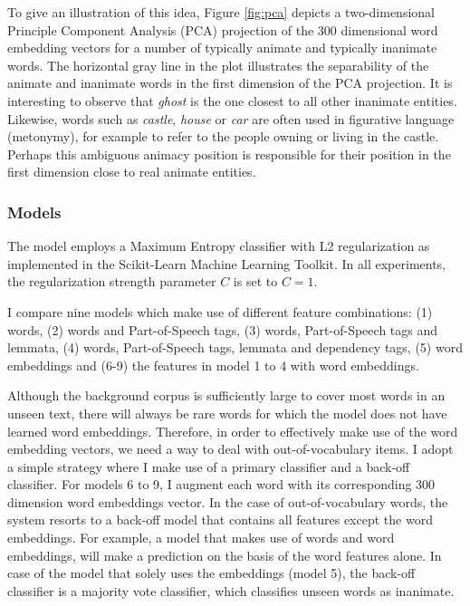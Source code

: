 To give an illustration of this idea, Figure \ref{fig:pca} depicts a two-dimensio\-nal Principle Component Analysis (PCA) projection of the 300 dimensional word embedding vectors for a number of typically animate and typically inanimate words. The horizontal gray line in the plot illustrates the separability of the animate and inanimate words in the first dimension of the PCA projection. It is interesting to observe that \emph{ghost} is the one closest to all other inanimate entities. Likewise, words such as \emph{castle}, \emph{house} or \emph{car} are often used in figurative language (metonymy), for example to refer to the people owning or living in the castle. Perhaps this ambiguous animacy position is responsible for their position in the first dimension close to real animate entities.


\subsubsection{Models}\label{sec:animacy-models}
The model employs a Maximum Entropy classifier with L2 regularization as implemented in the Scikit-Learn Machine Learning Toolkit\autocite{sklearn:2011}. In all experiments, the regularization strength parameter $C$ is set to $C=1$.

I compare nine models which make use of different feature combinations: (1) words, (2) words and Part-of-Speech tags, (3) words, Part-of-Speech tags and lemmata, (4) words, Part-of-Speech tags, lemmata and dependency tags, (5) word embeddings and (6-9) the features in model 1 to 4 with word embeddings.

Although the background corpus is sufficiently large to cover most words in an unseen text, there will always be rare words for which the model does not have learned word embeddings. Therefore, in order to effectively make use of the word embedding vectors, we need a way to deal with out-of-vocabulary items. I adopt a simple strategy where I make use of a primary classifier and a back-off classifier. For models 6 to 9, I augment each word with its corresponding 300 dimension word embeddings vector. In the case of out-of-vocabulary words, the system resorts to a back-off model that contains all features except the word embeddings. For example, a model that makes use of words and word embeddings, will make a prediction on the basis of the word features alone. In case of the model that solely uses the embeddings (model 5), the back-off classifier is a majority vote classifier, which classifies unseen words as inanimate.

